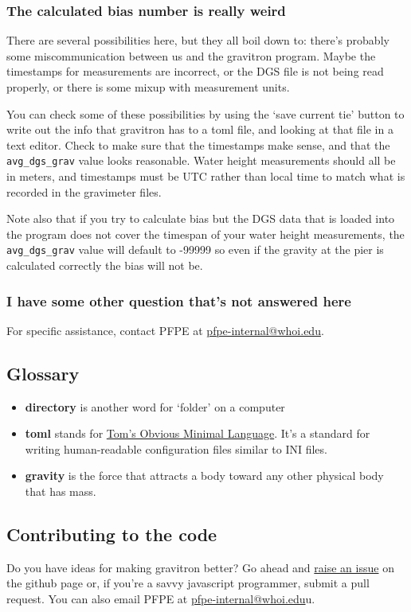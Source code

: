 \documentclass{pfpe-manual}
\begin{document}
\subsubsection{The calculated bias number is really weird}
There are several possibilities here, but they all boil down to: there's probably some miscommunication between us and the gravitron program. Maybe the timestamps for measurements are incorrect, or the DGS file is not being read properly, or there is some mixup with measurement units. 

You can check some of these possibilities by using the `save current tie' button to write out the info that gravitron has to a toml file, and looking at that file in a text editor. Check to make sure that the timestamps make sense, and that the \texttt{avg\_dgs\_grav} value looks reasonable. Water height measurements should all be in meters, and timestamps must be UTC rather than local time to match what is recorded in the gravimeter files.

Note also that if you try to calculate bias but the DGS data that is loaded into the program does not cover the timespan of your water height measurements, the \texttt{avg\_dgs\_grav} value will default to -99999 so even if the gravity at the pier is calculated correctly the bias will not be.

\subsubsection{I have some other question that's not answered here}
For specific assistance, contact PFPE at \href{mailto:pfpe-internal@whoi.edu}{pfpe-internal@whoi.edu}.

\subsection{Glossary}
\begin{itemize}
\item \textbf{directory} is another word for `folder' on a computer
\item \textbf{toml} stands for \href{https://toml.io/}{Tom's Obvious Minimal Language}. It's a standard for writing human-readable configuration files similar to INI files.
\item \textbf{gravity} is the force that attracts a body toward any other physical body that has mass.
\end{itemize}

\subsection{Contributing to the code}
Do you have ideas for making gravitron better? Go ahead and \href{https://github.com/PFPE/gravitron/issues}{raise an issue} on the github page or, if you're a savvy javascript programmer, submit a pull request. You can also email PFPE at \href{mailto:pfpe-internal@whoi.edu}{pfpe-internal@whoi.edu}u.
\end{document}
